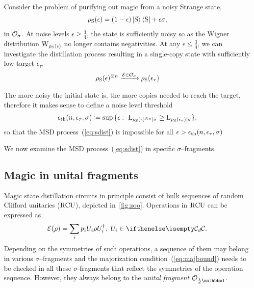 \documentclass[pra,
aps,
twocolumn,
superscriptaddress,
groupedaddress,
nofootinbib,
reprint
]{revtex4-1}
\begin{document}
Consider the problem of purifying out magic from a noisy Strange state,
\begin{equation}
    \rho_{\rm{S}}(\epsilon) = (1 - \epsilon) \ket{\rm{S}}\bra{\rm{S}} + \epsilon \sigma,
\end{equation}
in $\mathcal{O}_\sigma$.
At noise levels $\epsilon \geq \frac{3}{4}$, the state is sufficiently noisy so as the Wigner distribution $\W{\rho_{\rm{S}}(\epsilon)}$ no longer contains negativities. 
At any $\epsilon \leq \frac{3}{4}$, we can investigate the distillation process resulting in a single-copy state with sufficiently low target $\epsilon_{\tau}$,
\begin{equation}\label{eq:sdist}
	\rho_{\rm{S}}(\epsilon)^{\otimes n} \xrightarrow{\mathcal{E} \in \mathcal{O}_\sigma} \rho_{\rm{S}}(\epsilon_{\tau})
\end{equation}

The more noisy the initial state is, the more copies needed to reach the target, therefore it makes sense to define a noise level threshold 
\begin{equation}\label{eq:ethresh}
	\epsilon_{\rm{th}}(n, \epsilon_\tau, \sigma) \coloneqq \sup{\{\epsilon:\  {{\rm{L}}_{\rho_{\rm{S}}(\epsilon)^{\otimes n}|\sigma}}  \geq  {{\rm{L}}_{\rho_{\rm{S}}(\epsilon_{\tau})|\sigma}} \}},
\end{equation}
so that the MSD process~(\ref{eq:sdist}) is impossible for all $\epsilon > \epsilon_{\rm{th}}(n, \epsilon_\tau, \sigma)$

We now examine the MSD process~(\ref{eq:sdist}) in specific $\sigma$--fragments.

\subsection{Magic in unital fragments}\label{sec:unital}

Magic state distillation circuits in principle consist of bulk sequences of random Clifford unitaries (${\rm{RCU}}$), depicted in~\cref{fig:zoo}.
Operations in ${\rm{RCU}}$ can be expressed as
\begin{equation}
    \E(\rho) = \sum_i p_i U_i \rho U_i^\dagger,\ U_i \in \cd.
\end{equation}
Depending on the symmetries of such operations, a sequence of them may belong in various $\sigma$--fragments and the majorization condition~(\ref{eq:majbound}) needs to be checked in all these $\sigma$-fragments that reflect the symmetries of the operation sequence.
However, they always belong to the \emph{unital fragment} $\O_{\frac{1}{d}\id}$.
\end{document}
